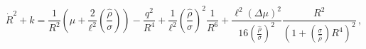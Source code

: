 \begin{equation}\dot{R}^2+k=\frac{1}{R^2}\left(\mu+\frac{2}{\ell^2}
\left(\frac{\hat{\rho}}{\sigma}\right)\right)
-\frac{q^2}{R^4}+\frac{1}{\ell^2}\left(\frac{\hat{\rho}}{\sigma}\right)^2
\frac{1}{R^6}+ \frac{\ell^2(\Delta\mu)^2}{16\left(\frac{\hat{\rho}}{\sigma}
\right)^2}\frac{R^2}{\left(1+\left(\frac{\sigma}{\hat{\rho}}\right)R^4\right)^2}\,,
\end{equation}

